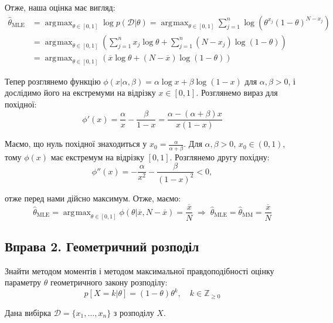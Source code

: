 \documentclass{hw_template}
\DeclareMathOperator*{\argmax}{\arg\!\max}
\begin{document}
Отже, наша оцінка має вигляд:
\begin{align*}
    \hat{\theta}_{\text{MLE}} &= \argmax_{\theta \in [0,1]} \log p(\mathcal{D}|\theta) = \argmax_{\theta \in [0,1]} \sum_{j=1}^n \log\left(\theta^{x_j}(1-\theta)^{N-x_j}\right) \\ &= \argmax_{\theta \in [0,1]} \left(\sum_{j=1}^n x_j \log \theta + \sum_{j=1}^{n}(N - x_j)\log(1 - \theta)\right) \\ &= \argmax_{\theta \in [0,1]}\left(\overline{x}\log\theta + (N - \overline{x})\log(1-\theta)\right)
\end{align*}

Тепер розглянемо функцію $\phi(x|\alpha,\beta) = \alpha \log x + \beta \log (1-x)$ для $\alpha,\beta > 0$, і дослідимо його на екстремуми на відрізку $x \in [0,1]$. Розглянемо вираз для похідної:
\begin{equation*}
    \phi'(x) = \frac{\alpha}{x} - \frac{\beta}{1-x} = \frac{\alpha - (\alpha+\beta)x}{x(1-x)}
\end{equation*}

Маємо, що нуль похідної знаходиться у $x_0 = \frac{\alpha}{\alpha+\beta}$. Для $\alpha,\beta>0$, $x_0 \in (0,1)$, тому $\phi(x)$ має екстремум на відрізку $[0,1]$. Розглянемо другу похідну:
\begin{equation*}
    \phi''(x) = -\frac{\alpha}{x^2} - \frac{\beta}{(1-x)^2} < 0,
\end{equation*}

отже перед нами дійсно максимум. Отже, маємо:
\begin{equation*}
    \hat{\theta}_{\text{MLE}} = \argmax_{\theta \in [0,1]}\phi(\theta|\overline{x}, N - \overline{x}) = \frac{\overline{x}}{N} \;\Rightarrow\; \boxed{\hat{\theta}_{\text{MLE}} = \hat{\theta}_{\text{MM}} = \frac{\overline{x}}{N}}
\end{equation*}

\subsection{Вправа 2. Геометричний розподіл}

\begin{problem}
    Знайти методом моментів і методом максимальної правдоподібності оцінку параметру $\theta$
    геометричного закону розподілу:
    \begin{equation*}
        p[X = k|\theta] = (1-\theta)\theta^k, \quad k \in \mathbb{Z}_{\geq 0}
    \end{equation*}

    Дана вибірка $\mathcal{D} = \{x_1,\dots,x_n\}$ з розподілу $X$.
\end{problem}
\end{document}
